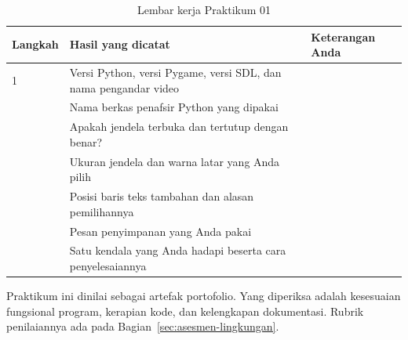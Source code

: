 \begin{table}[htbp]
\centering
\caption{Lembar kerja Praktikum 01}
\label{tab:lembar-praktikum-01}
{\setlength{\tabcolsep}{4pt}\footnotesize%
\begin{tabularx}{\textwidth}{@{}C{1.6cm} L{5.0cm} Y@{}}
\toprule
\headrow \textbf{Langkah} & \textbf{Hasil yang dicatat} & \textbf{Keterangan Anda} \\
 & Versi Python, versi Pygame, versi SDL, dan nama pengandar video & \\[1.2em]
 & Nama berkas penafsir Python yang dipakai & \\[1.2em]
 & Apakah jendela terbuka dan tertutup dengan benar? & \\[1.2em]
 & Ukuran jendela dan warna latar yang Anda pilih & \\[1.2em]
 & Posisi baris teks tambahan dan alasan pemilihannya & \\[1.2em]
 & Pesan penyimpanan yang Anda pakai & \\[1.2em]
 & Satu kendala yang Anda hadapi beserta cara penyelesaiannya & \\[2.0em]
\bottomrule
\end{tabularx}}
\end{table}

\begin{catatabox}
Praktikum ini dinilai sebagai artefak portofolio. Yang diperiksa adalah
kesesuaian fungsional program, kerapian kode, dan kelengkapan dokumentasi.
Rubrik penilaiannya ada pada Bagian~\ref{sec:asesmen-lingkungan}.
\end{catatabox}
